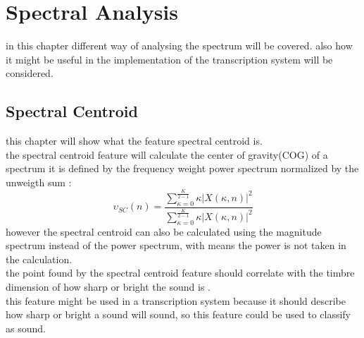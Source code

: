\section{Spectral Analysis}
in this chapter different way of analysing the spectrum will be covered. also how it might be useful in the implementation of the transcription system will be considered.
\subsection{Spectral Centroid}
this chapter will show what the feature spectral centroid is.\\
the spectral centroid feature will calculate the center of gravity(COG) of a spectrum it is defined by the frequency weight power spectrum normalized by the unweigth sum \citep{ACA}:
\begin{equation}\label{Spectral Centroid eq}
	\upsilon_{SC}(n) = \frac{\displaystyle\sum_{\kappa = 0}^{\frac{K}{2-1}} \kappa\vert X(\kappa,n) \vert^2}{\displaystyle\sum_{\kappa = 0}^{\frac{K}{2-1}} \kappa\vert X(\kappa,n) \vert^2 }    
\end{equation} 
however the spectral centroid can also be calculated using the magnitude spectrum instead of the power spectrum, with means the power is not taken in the calculation\citep{ACA}.
\\
the point found by the spectral centroid feature should correlate with the timbre dimension of how sharp or bright the sound is \citep{ACA}. 
\\
this feature might be used in a transcription system because it should describe how sharp or bright a sound will sound, so this feature could be used to classify as sound. 
